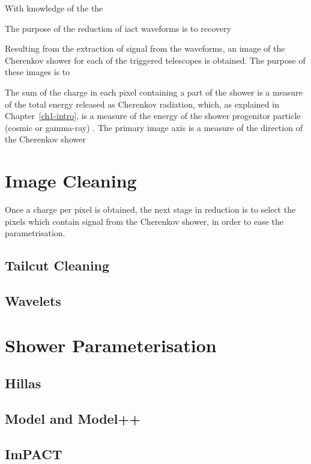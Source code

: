 With knowledge of the the 

The purpose of the reduction of \gls{iact} waveforms is to recovery 

Resulting from the extraction of signal from the waveforms, an image of the Cherenkov shower for each of the triggered telescopes is obtained. The purpose of these images is to 


The sum of the charge in each pixel containing a part of the shower is a measure of the total energy released as Cherenkov radiation, which, as explained in Chapter~\ref{ch1-intro}, is a measure of the energy of the shower progenitor particle (cosmic or gamma-ray) . The primary image axis is a measure of the direction of the Cherenkov shower


\section{Image Cleaning} \label{section:image_cleaning}

Once a charge per pixel is obtained, the next stage in reduction is to select the pixels which contain signal from the Cherenkov shower, in order to ease the parametrisation. 

\subsection{Tailcut Cleaning}

\subsection{Wavelets}

\section{Shower Parameterisation}

\subsection{Hillas}

\subsection{Model and Model++}

\subsection{ImPACT}

